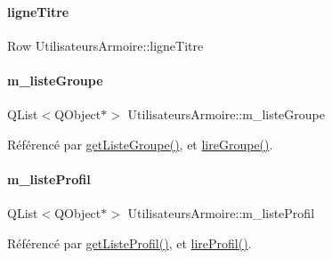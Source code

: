 \paragraph{\texorpdfstring{ligne\+Titre}{ligneTitre}}
{\footnotesize\ttfamily Row Utilisateurs\+Armoire\+::ligne\+Titre\hspace{0.3cm}{\ttfamily [private]}}

\mbox{\label{class_utilisateurs_armoire_a85558a0f373c06315c3c5f2e4e9e660c}} 
\paragraph{\texorpdfstring{m\+\_\+liste\+Groupe}{m\_listeGroupe}}
{\footnotesize\ttfamily Q\+List$<$Q\+Object$\ast$$>$ Utilisateurs\+Armoire\+::m\+\_\+liste\+Groupe\hspace{0.3cm}{\ttfamily [private]}}



Référencé par \hyperlink{class_utilisateurs_armoire_a5fd8e356a1fffd330f47935dfb843e6a}{get\+Liste\+Groupe()}, et \hyperlink{class_utilisateurs_armoire_aeadd41da356116c6e393d832e2b819e9}{lire\+Groupe()}.

\mbox{\label{class_utilisateurs_armoire_a0687ace99585d71b2636feaf2163b905}} 
\paragraph{\texorpdfstring{m\+\_\+liste\+Profil}{m\_listeProfil}}
{\footnotesize\ttfamily Q\+List$<$Q\+Object$\ast$$>$ Utilisateurs\+Armoire\+::m\+\_\+liste\+Profil\hspace{0.3cm}{\ttfamily [private]}}



Référencé par \hyperlink{class_utilisateurs_armoire_a153930c5840343585f2d0195405df382}{get\+Liste\+Profil()}, et \hyperlink{class_utilisateurs_armoire_a952931c38642273c5e959edb69706144}{lire\+Profil()}.

\mbox{\label{class_utilisateurs_armoire_ac43b4894f5036117d044ad2d22b09318}} 
